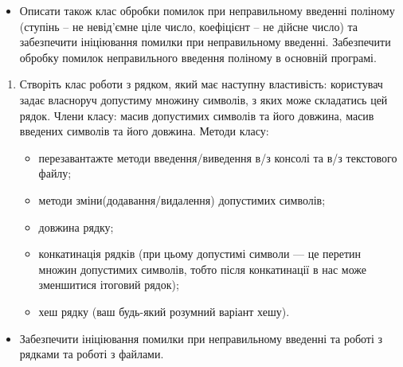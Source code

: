 \documentclass[]{article}
\begin{document}
\begin{itemize}
\item
  Описати також клас обробки помилок при неправильному введенні поліному
  (ступінь -- не невід'ємне ціле число, коефіцієнт -- не дійсне число)
  та забезпечити ініціювання помилки при неправильному введенні.
  Забезпечити обробку помилок неправильного введення поліному в основній
  програмі.
\end{itemize}

\begin{enumerate}
\def\labelenumi{\arabic{enumi}.}
\item
  Створіть клас роботи з рядком, який має наступну властивість:
  користувач задає власноруч допустиму множину символів, з яких може
  складатись цей рядок. Члени класу: масив допустимих символів та його
  довжина, масив введених символів та його довжина. Методи класу:

  \begin{itemize}
  \item
    перезавантажте методи введення/виведення в/з консолі та в/з
    текстового файлу;
  \item
    методи зміни(додавання/видалення) допустимих символів;
  \item
    довжина рядку;
  \item
    конкатинація рядків (при цьому допустимі символи --- це перетин
    множин допустимих символів, тобто після конкатинації в нас може
    зменшитися ітоговий рядок);
  \item
    хеш рядку (ваш будь-який розумний варіант хешу).
  \end{itemize}
\end{enumerate}

\begin{itemize}
\item
  Забезпечити ініціювання помилки при неправильному введенні та роботі з
  рядками та роботі з файлами.
\end{itemize}
\end{document}
